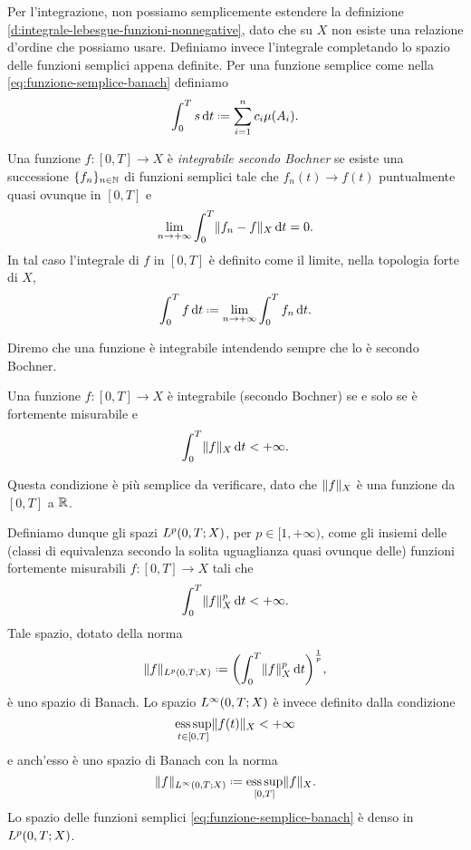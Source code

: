 Per l'integrazione, non possiamo semplicemente estendere la definizione \ref{d:integrale-lebesgue-funzioni-nonnegative}, dato che su $X$ non esiste una relazione d'ordine che possiamo usare.
Definiamo invece l'integrale completando lo spazio delle funzioni semplici appena definite.
Per una funzione semplice come nella \eqref{eq:funzione-semplice-banach} definiamo
\begin{equation}
    \int_0^T s\,\dd t\defeq\sum_{i=1}^nc_i\mu(A_i).
    \label{eq:integrale-funzione-semplice-banach}
\end{equation}
\begin{definizione} \label{d:integrale-bochner}
    Una funzione $f\colon[0,T]\to X$ è \emph{integrabile secondo Bochner} se esiste una successione $\{f_n\}_{n\in\N}$ di funzioni semplici tale che $f_n(t)\to f(t)$ puntualmente quasi ovunque in $[0,T]$ e
    \begin{equation}
        \lim_{n\to+\infty}\int_0^T\norm{f_n-f}_X\,\dd t=0.
    \end{equation}
    In tal caso l'integrale di $f$ in $[0,T]$ è definito come il limite, nella topologia forte di $X$,
    \begin{equation}
        \int_0^T f\,\dd t\defeq\lim_{n\to+\infty}\int_0^T f_n\,\dd t.
        \label{eq:integrale-bochner}
    \end{equation}
\end{definizione}
Diremo che una funzione è integrabile intendendo sempre che lo è secondo Bochner.
\begin{teorema}[Bochner] \label{t:bochner}
    Una funzione $f\colon[0,T]\to X$ è integrabile (secondo Bochner) se e solo se è fortemente misurabile e
    \begin{equation}
        \int_0^T\norm{f}_X\,\dd t<+\infty.
    \end{equation}
\end{teorema}
Questa condizione è più semplice da verificare, dato che $\norm{f}_X$ è una funzione da $[0,T]$ a $\R$.

Definiamo dunque gli spazi $\leb[p]{0,T;X}$, per $p\in[1,+\infty)$, come gli insiemi delle (classi di equivalenza secondo la solita uguaglianza quasi ovunque delle) funzioni fortemente misurabili $f\colon[0,T]\to X$ tali che
\begin{equation}
    \int_0^T\norm{f}_X^p\,\dd t<+\infty.
\end{equation}
Tale spazio, dotato della norma
\begin{equation}
    \norm{f}_{\leb[p]{0,T;X}}\defeq\biggl(\int_0^T\norm{f}_X^p\,\dd t\biggr)^\frac1{p},
    \label{eq:p-norma-banach}
\end{equation}
è uno spazio di Banach.
Lo spazio $\leb[\infty]{0,T;X}$ è invece definito dalla condizione
\begin{equation}
    \esssup_{t\in[0,T]}\norm{f(t)}_X<+\infty
\end{equation}
e anch'esso è uno spazio di Banach con la norma
\begin{equation}
    \norm{f}_{\leb[\infty]{0,T;X}}\defeq\esssup_{[0,T]}\norm{f}_X.
    \label{eq:p-norma-infinito-banach}
\end{equation}
Lo spazio delle funzioni semplici \eqref{eq:funzione-semplice-banach} è denso in $\leb[p]{0,T;X}$.
